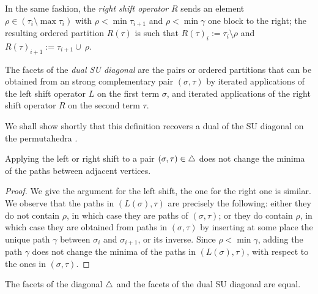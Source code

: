 In the same fashion, the \emph{right shift operator} $R$ sends an element $\rho \in (\tau_{i} \setminus \max\tau_{i})$ with $\rho < \min \tau_{i+1}$ and $\rho < \min \gamma$ one block to the right; the resulting ordered partition $R(\tau)$ is such that $R(\tau)_i := \tau_i \setminus \rho$ and $R(\tau)_{i+1} := \tau_{i+1} \cup \ \rho$.

\begin{definition}
    The facets of the \emph{dual SU diagonal} are the pairs or ordered partitions that can be obtained from an strong complementary pair $(\sigma,\tau)$ by iterated applications of the left shift operator $L$ on the first term $\sigma$, and iterated applications of the right shift operator $R$ on the second term $\tau$. 
\end{definition}

We shall show shortly that this definition recovers a dual of the SU diagonal on the permutahedra \cite{SaneblidzeUmble04}.

\begin{lemma}
\label{l:minima-invariance}
    Applying the left or right shift to a pair $(\sigma,\tau) \in \triangle$ does not change the minima of the paths between adjacent vertices. 
\end{lemma}

\begin{proof}
We give the argument for the left shift, the one for the right one is similar. 
We observe that the paths in $(L(\sigma), \tau)$ are precisely the following: either they do not contain $\rho$, in which case they are paths of $(\sigma, \tau)$; or they do contain $\rho$, in which case they are obtained from paths in $(\sigma,\tau)$ by inserting at some place the unique path $\gamma$ between $\sigma_i$ and $\sigma_{i+1}$, or its inverse. 
Since $\rho < \min \gamma$, adding the path $\gamma$ does not change the minima of the paths in $(L(\sigma), \tau)$, with respect to the ones in $(\sigma, \tau)$.
\end{proof}

\begin{thm}
\label{t:iso-with-SU}
    The facets of the diagonal $\triangle$ and the facets of the dual SU diagonal are equal. 
\end{thm}

